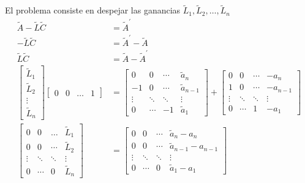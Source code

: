 El problema consiste en despejar las ganancias \( \tilde{L}_{1}, \tilde{L}_{2}, \ldots, \tilde{L}_{n}  \)
\[
    \begin{split}
        \tilde{A} - \tilde{L} \tilde{C} & = \tilde{A}^{'} \\ 
    -\tilde{L} \tilde{C} & = \tilde{A}^{'} - \tilde{A} \\
    \tilde{L} \tilde{C} & = \tilde{A} - \tilde{A}^{'} \\
    \begin{bmatrix}
        \tilde{L}_{1} \\ \tilde{L}_{2} \\ \vdots \\ \tilde{L}_{n}
    \end{bmatrix}
    \begin{bmatrix}
        0 & 0 & \ldots & 1
    \end{bmatrix} & =
    \begin{bmatrix}
        0 & 0 & \cdots & \tilde{a}_{n} \\
        -1 & 0 & \cdots & \tilde{a}_{n-1} \\
        \vdots & \ddots & \ddots & \vdots \\
        0 & \cdots & -1 & \tilde{a}_{1}
    \end{bmatrix}
    +
    \begin{bmatrix}
        0 & 0 & \cdots & -a_{n} \\
        1 & 0 & \cdots & -a_{n-1} \\
        \vdots & \ddots & \ddots & \vdots \\
        0 & \cdots & 1 & -a_{1}
    \end{bmatrix} \\
    \begin{bmatrix}
        0 & 0 & \ldots & \tilde{L}_{1} \\
        0 & 0 & \cdots & \tilde{L}_{2} \\
        \vdots & \ddots & \ddots & \vdots \\
        0 & \cdots & 0 & \tilde{L}_{n}
    \end{bmatrix} 
    & =
    \begin{bmatrix}
        0 & 0 & \cdots & \tilde{a}_{n} - a_{n} \\
        0 & 0 & \cdots & \tilde{a}_{n-1} - a_{n-1} \\
        \vdots & \ddots & \ddots & \vdots \\
        0 & \cdots & 0 & \tilde{a}_{1} - a_{1}
    \end{bmatrix} \\
    \end{split}
\]


